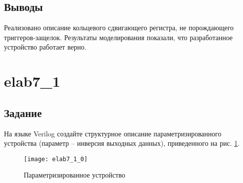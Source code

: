 \subsection{Выводы}

Реализовано описание кольцевого сдвигающего регистра, не порождающего триггеров-защелок. Результаты моделирования показали, что разработанное устройство работает верно.

\newpage

\section{elab7\_1}

\subsection{Задание}

На языке Verilog создайте структурное описание параметризированного устройства (параметр  -- инверсия выходных данных), приведенного на рис. \ref{fig:elab7_1_0}.

\begin{figure}[H]
\begin{center}
	\texttt{[image: elab7\_1\_0]}
	\caption{Параметризированное устройство}
	\label{fig:elab7_1_0}
\end{center}
\end{figure}
\vspace{-0.5cm}

